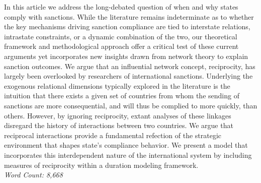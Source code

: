 In this article we address the long-debated question of when and why states comply with sanctions. While the literature remains indeterminate as to whether the key mechanisms driving sanction compliance are tied to interstate relations, intrastate constraints, or a dynamic combination of the two, our theoretical framework and methodological approach offer a critical test of these current arguments yet incorporates new insights drawn from network theory to explain sanction outcomes. We argue that an influential network concept, reciprocity, has largely been overlooked by researchers of international sanctions. Underlying the exogenous
relational dimensions typically explored in the literature is the intuition that there exists a given set of countries from whom the sending of sanctions are more consequential, and will thus be complied to more quickly, than others. However, by ignoring reciprocity, extant analyses of these linkages disregard the history of interactions between two countries. We argue that reciprocal interactions provide a fundamental refection of the strategic environment that shapes state's compliance behavior. We present a model that incorporates this interdependent nature of the international system by including measures of reciprocity within a duration modeling framework.\\

\noindent \textit{Word Count: 8,668}

